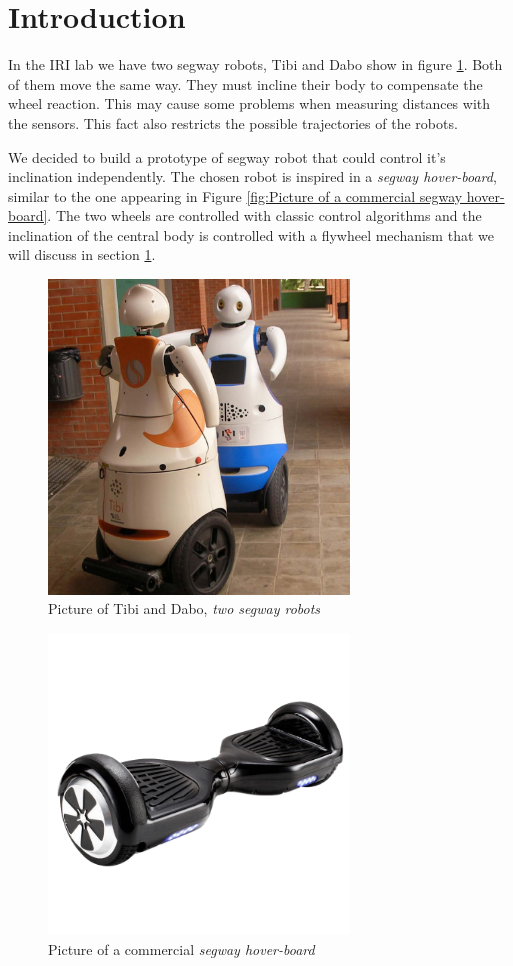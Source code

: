 \section{Introduction}
In the IRI lab we have two segway robots, Tibi and Dabo show in figure
\ref{fig:Picture of Tibi and Dabo}. Both of them move the same way.
They must incline their body to compensate the wheel reaction. 
This may cause some problems when measuring distances with the sensors.
This fact also restricts the possible trajectories of the robots. 

We decided to build a prototype of segway robot that could control it's
inclination independently. The chosen robot is inspired in a \textit{segway hover-board}, 
similar to the one appearing in Figure \ref{fig:Picture of a commercial 
segway hover-board}. The two wheels are controlled with classic
control algorithms and the inclination of the central body is
controlled with a flywheel mechanism that we will discuss in section \ref{}.

\begin{figure}
	\centering
	\includegraphics[width=8cm]{img/robots-TIBI-i-DABO-IRI-red.jpg}
	\caption{Picture of Tibi and Dabo, \textit{two segway robots} }
	\label{fig:Picture of Tibi and Dabo}
\end{figure}

\begin{figure}
	\centering
	\includegraphics[width=8cm]{img/segway_hoverboard_picture.png}
	\caption{Picture of a commercial \textit{segway hover-board} }
	\label{fig:Picture of a commercial segway hover-board}
\end{figure}
